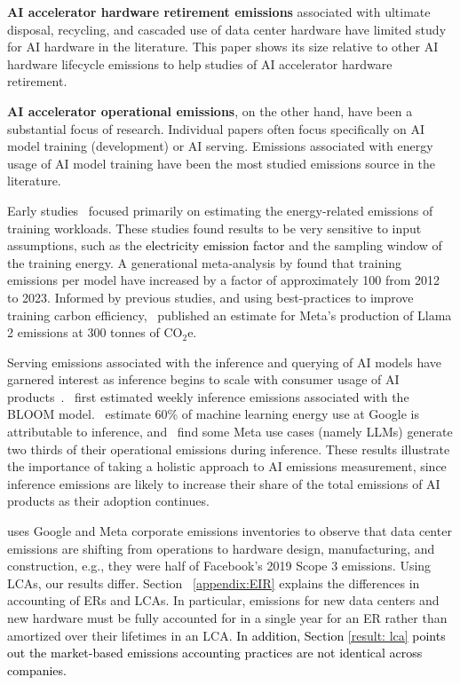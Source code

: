 \textbf{AI accelerator hardware retirement emissions} associated with ultimate disposal, recycling, and cascaded use of data center hardware have limited study for AI hardware in the literature. This paper shows its size relative to other AI hardware lifecycle emissions to help studies of AI accelerator hardware retirement.

\textbf{AI accelerator operational emissions}, on the other hand,  have been a substantial focus of research. Individual papers often focus specifically on AI model training (development) or AI serving. Emissions associated with energy usage of AI model training have been the most studied emissions source in the literature. 

Early studies~\citep{Strubell2019,Patterson2021} focused primarily on estimating the energy-related emissions of training workloads. These studies found results to be very sensitive to input assumptions, such as the \textcolor{black}{electricity emission factor} and the sampling window of the training energy. A generational meta-analysis by \citet{Luccioni2023} found that training emissions per model have increased by a factor of approximately 100 from 2012 to 2023. Informed by previous studies, and using best-practices to improve training carbon efficiency, \citet{Touvron2023}~published an estimate for Meta’s production of Llama 2 emissions at 300 tonnes of CO$_{2}$e. 

Serving emissions associated with the inference and querying of AI models have garnered interest as inference begins to scale with consumer usage of AI products~\citep{patterson2024energy}. \citet{Luccioni2022}~first estimated weekly inference emissions associated with the BLOOM model. \citet{Patterson2022}~estimate 60\% of machine learning energy use at Google is attributable to inference, and \citet{Wu2022}~find some Meta use cases (namely LLMs) generate two thirds of their operational emissions during inference. These results illustrate the importance of taking a holistic approach to AI emissions measurement, since inference emissions are likely to increase their share of the total emissions of AI products as their adoption continues. 

\citet{Gupta2021} uses Google and Meta corporate emissions inventories to observe that data center emissions are shifting from operations to hardware design, manufacturing, and construction, e.g., they were half of Facebook’s 2019 Scope 3 emissions. Using LCAs, our results differ. Section ~\ref{appendix:EIR} explains the differences in accounting of ERs and LCAs. In particular, emissions for new data centers and new hardware must be fully accounted for in a single year for an ER rather than amortized over their lifetimes in an LCA.  \textcolor{black}{In addition, Section \ref{result: lca} points out the market-based emissions accounting practices are not identical across companies.}

